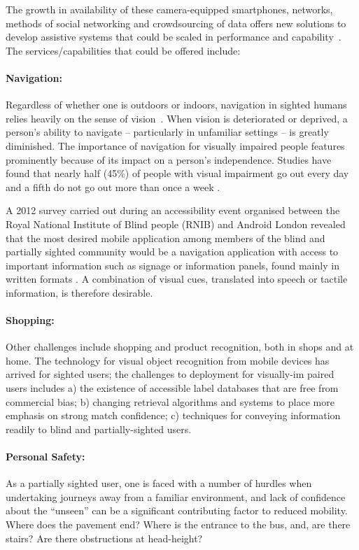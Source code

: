 The growth in availability of these camera-equipped smartphones, networks, methods of social networking and crowdsourcing of data offers new solutions to develop assistive systems that could be scaled in performance and capability~\cite{Manduchi2012,Worsfold2010}. The services/capabilities that could be offered include:

\paragraph{Navigation:} Regardless of whether one is outdoors or indoors, navigation in sighted humans relies heavily on the sense of vision~\citep{kalia2008learning,tsuji2005landmarks}. When vision is deteriorated or deprived, a person's ability to navigate -- particularly in unfamiliar settings -- is greatly diminished. The importance of navigation for visually impaired people features prominently because of its impact on a person's independence. Studies have found that nearly half (45\%) of people with visual impairment go out every day and a fifth do not go out more than once a week \citep{douglas2006network, RNIB2009}.

A 2012 survey carried out during an accessibility event organised between the Royal National Institute of Blind people (RNIB) and Android London revealed that the most desired mobile application among members of the blind and partially sighted community would be a navigation application with access to important information such as signage or information panels, found mainly in written formats \citep{RNIB2012}. A combination of visual cues, translated into speech or tactile information, is therefore desirable.

\paragraph{Shopping:} Other challenges include shopping and product recognition, both in shops and at home. The technology for visual object recognition from mobile devices has arrived for sighted users; the challenges to deployment for visually\--im\-	paired users includes a) the existence of accessible label da\-ta\-ba\-ses that are free from commercial bias; b) changing retrieval algorithms and systems to place more emphasis on strong match confidence; c) techniques for conveying information readily to blind and partially-sighted users.

\paragraph{Personal Safety:} As a partially sighted user, one is faced with a number of hurdles when undertaking journeys away from a familiar environment, and lack of confidence about the ``unseen'' can be a significant contributing factor to reduced mobility.  Where does the pavement end?  Where is the entrance to the bus, and, are there stairs?  Are there obstructions at head-height?   

